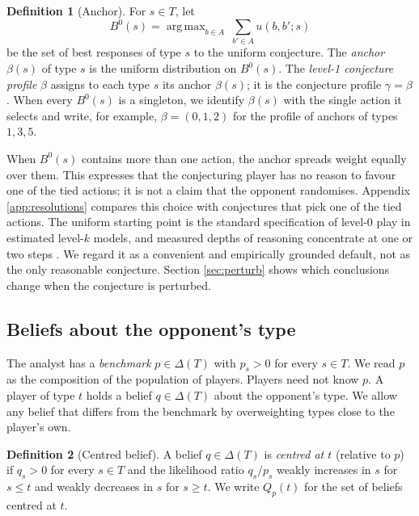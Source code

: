 \documentclass[12pt]{article}
\theoremstyle{definition}
\newtheorem{definition}{Definition}
\DeclareMathOperator*{\argmax}{arg\,max}
\begin{document}
\begin{definition}[Anchor]\label{def:anchor}
For $s \in T$, let
\[
B^0(s) = \argmax_{b \in A} \ \sum_{b' \in A} u(b, b'; s)
\]
be the set of best responses of type $s$ to the uniform conjecture. The \emph{anchor} $\beta(s)$ of type $s$ is the uniform distribution on $B^0(s)$. The \emph{level-1 conjecture profile} $\beta$ assigns to each type $s$ its anchor $\beta(s)$; it is the conjecture profile $\gamma = \beta$. When every $B^0(s)$ is a singleton, we identify $\beta(s)$ with the single action it selects and write, for example, $\beta = (0,1,2)$ for the profile of anchors of types $1, 3, 5$.
\end{definition}

When $B^0(s)$ contains more than one action, the anchor spreads weight equally over them. This expresses that the conjecturing player has no reason to favour one of the tied actions; it is not a claim that the opponent randomises. Appendix \ref{app:resolutions} compares this choice with conjectures that pick one of the tied actions. The uniform starting point is the standard specification of level-0 play in estimated level-$k$ models, and measured depths of reasoning concentrate at one or two steps \citep{nagel1995, stahl1995, costagomes2001, crawford2007levelk, arad2012}. We regard it as a convenient and empirically grounded default, not as the only reasonable conjecture. Section \ref{sec:perturb} shows which conclusions change when the conjecture is perturbed.

\subsection{Beliefs about the opponent's type}

The analyst has a \emph{benchmark} $p \in \Delta(T)$ with $p_s > 0$ for every $s \in T$. We read $p$ as the composition of the population of players. Players need not know $p$. A player of type $t$ holds a belief $q \in \Delta(T)$ about the opponent's type. We allow any belief that differs from the benchmark by overweighting types close to the player's own.

\begin{definition}[Centred belief]\label{def:centred}
A belief $q \in \Delta(T)$ is \emph{centred at $t$} (relative to $p$) if $q_s > 0$ for every $s \in T$ and the likelihood ratio $q_s/p_s$ weakly increases in $s$ for $s \le t$ and weakly decreases in $s$ for $s \ge t$. We write $Q_p(t)$ for the set of beliefs centred at $t$.
\end{definition}
\end{document}
